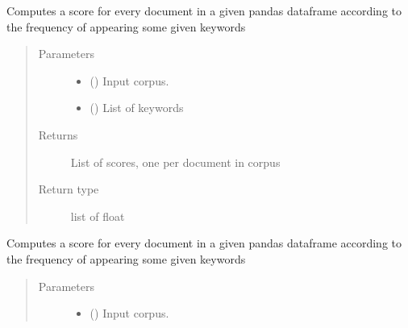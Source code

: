 \documentclass[letterpaper,10pt,english]{sphinxmanual}
\begin{document}
\begin{fulllineitems}
\begin{fulllineitems}
\label{\detokenize{dc_preprocessor:src.domain_classifier.preprocessor.CorpusProcessor.score_docs_by_keyword_count}}
\sphinxAtStartPar
Computes a score for every document in a given pandas dataframe
according to the frequency of appearing some given keywords
\begin{quote}\begin{description}
\item[{Parameters}] \leavevmode\begin{itemize}
\item {} 
\sphinxAtStartPar
{} () \textendash{} Input corpus.

\item {} 
\sphinxAtStartPar
{} () \textendash{} List of keywords

\end{itemize}

\item[{Returns}] \leavevmode
\sphinxAtStartPar
{} \textendash{} List of scores, one per document in corpus

\item[{Return type}] \leavevmode
\sphinxAtStartPar
list of float

\end{description}\end{quote}

\end{fulllineitems}


\begin{fulllineitems}
\label{\detokenize{dc_preprocessor:src.domain_classifier.preprocessor.CorpusProcessor.score_docs_by_keywords}}
\sphinxAtStartPar
Computes a score for every document in a given pandas dataframe
according to the frequency of appearing some given keywords
\begin{quote}\begin{description}
\item[{Parameters}] \leavevmode\begin{itemize}
\item {} 
\sphinxAtStartPar
{} () \textendash{} Input corpus.


\end{itemize}
\end{description}
\end{quote}
\end{fulllineitems}
\end{fulllineitems}
\end{document}
